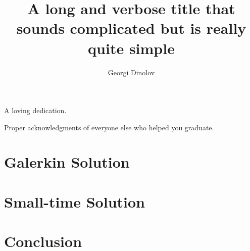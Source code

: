 



\title{A long and verbose title that sounds complicated but is really quite simple}
\author{Georgi Dinolov}
\deanlinethree{}

\begin{frontmatter}
\maketitle

\copyrightpage

\tableofcontents

\listoffigures

\listoftables

\begin{abstract}

\end{abstract}

\begin{dedication}
\vspace*{\fill}
\begin{center}
A loving dedication.
\end{center}
\vspace*{\fill}
\end{dedication}

\begin{acknowledgements}
Proper acknowledgments of everyone else who helped you graduate.
\end{acknowledgements}

\end{frontmatter}

\chapter{Galerkin Solution}


\chapter{Small-time Solution}


\chapter{Conclusion}



\nocite{*}

\singlespacing

\doublespacing

